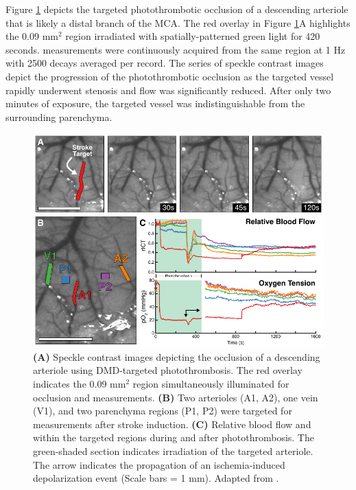 Figure \ref{fig:photothrombosisacute} depicts the targeted photothrombotic occlusion of a descending arteriole that is likely a distal branch of the MCA. The red overlay in Figure \ref{fig:photothrombosisacute}A highlights the 0.09 mm$^2$ region irradiated with spatially-patterned green light for 420 seconds.  measurements were continuously acquired from the same region at 1 Hz with 2500 decays averaged per record. The series of speckle contrast images depict the progression of the photothrombotic occlusion as the targeted vessel rapidly underwent stenosis and flow was significantly reduced. After only two minutes of exposure, the targeted vessel was indistinguishable from the surrounding parenchyma.

\begin{figure}
    \includegraphics{figures/chapter_3/photothrombosisacute.pdf}
    \caption[\textbf{(A)} Speckle contrast images depicting the occlusion of a descending arteriole using DMD-targeted photothrombosis. The red overlay indicates the 0.09 mm$^2$ region simultaneously illuminated for occlusion and  measurements. \textbf{(B)} Two arterioles (A1, A2), one vein (V1), and two parenchyma regions (P1, P2) were targeted for  measurements after stroke induction. \textbf{(C)} Relative blood flow and  within the targeted regions during and after photothrombosis. The green-shaded section indicates irradiation of the targeted arteriole. The arrow indicates the propagation of an ischemia-induced depolarization event (Scale bars = 1 mm).]{
        \label{fig:photothrombosisacute}
        \textbf{(A)} Speckle contrast images depicting the occlusion of a descending arteriole using DMD-targeted photothrombosis. The red overlay indicates the 0.09 mm$^2$ region simultaneously illuminated for occlusion and  measurements. \textbf{(B)} Two arterioles (A1, A2), one vein (V1), and two parenchyma regions (P1, P2) were targeted for  measurements after stroke induction. \textbf{(C)} Relative blood flow and  within the targeted regions during and after photothrombosis. The green-shaded section indicates irradiation of the targeted arteriole. The arrow indicates the propagation of an ischemia-induced depolarization event (Scale bars = 1 mm). Adapted from \cite{Sullender:2018ff}.
    }
\end{figure}

